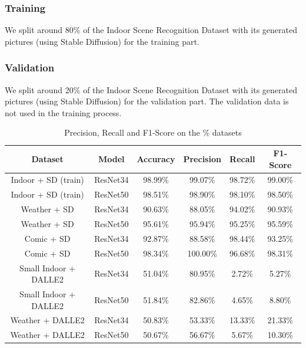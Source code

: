\documentclass[11pt]{article}
\begin{document}
\subsubsection{Training}

We split around 80\% of the Indoor Scene Recognition Dataset with its generated pictures (using Stable Diffusion) for the training part.

\subsubsection{Validation}

We split around 20\% of the Indoor Scene Recognition Dataset with its generated pictures (using Stable Diffusion) for the validation part. The validation data is not used in the training process.
\begin{table}
  \centering
  \begin{tabular}{c|c||c|c|c|c}
    \hline
    \textbf{Dataset}      & \textbf{Model} & \textbf{Accuracy} & \textbf{Precision} & \textbf{Recall} & \textbf{F1-Score} \\
    \hline
    Indoor + SD (train)   & ResNet34       & {98.99\%}         & {99.07\%}          & {98.72\%}       & {99.00\%}         \\
    Indoor + SD (train)   & ResNet50       & {98.51\%}         & {98.90\%}          & {98.10\%}       & {98.50\%}         \\
    \hline
    Weather + SD          & ResNet34       & {90.63\%}         & {88.05\%}          & {94.02\%}       & {90.93\%}         \\
    Weather + SD          & ResNet50       & {95.61\%}         & {95.94\%}          & {95.25\%}       & {95.59\%}         \\
    Comic + SD            & ResNet34       & {92.87\%}         & {88.58\%}          & {98.44\%}       & {93.25\%}         \\
    Comic + SD            & ResNet50       & {98.34\%}         & {100.00\%}         & {96.68\%}       & {98.31\%}         \\
    Small Indoor + DALLE2 & ResNet34       & {51.04\%}         & {80.95\%}          & {2.72\%}        & {5.27\%}          \\
    Small Indoor + DALLE2 & ResNet50       & {51.84\%}         & {82.86\%}          & {4.65\%}        & {8.80\%}          \\
    Weather + DALLE2      & ResNet34       & {50.83\%}         & {53.33\%}          & {13.33\%}       & {21.33\%}         \\
    Weather + DALLE2      & ResNet50       & {50.67\%}         & {56.67\%}          & {5.67\%}        & {10.30\%}         \\
    \hline
  \end{tabular}
  \caption{Precision, Recall and F1-Score on the \% datasets}
  \label{tab:results-on-datasets}
\end{table}
\end{document}
